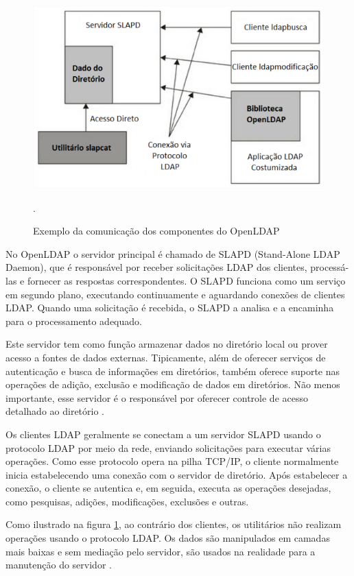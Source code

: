 \begin{figure}[h]
    \centering
	\includegraphics[scale=0.9]{projeto/textuais/ComunicacaoLDAP.png}
	\caption[Exemplo da comunicação dos componentes do OpenLDAP]{Exemplo da comunicação dos componentes do OpenLDAP \cite{lima2021estudo}}.
	\label{fig:compLDAP}
\end{figure}

No OpenLDAP o servidor principal é chamado de SLAPD (Stand-Alone LDAP Daemon), que é responsável por receber solicitações LDAP dos clientes, processá-las e fornecer as respostas correspondentes. O SLAPD funciona como um serviço em segundo plano, executando continuamente e aguardando conexões de clientes LDAP. Quando uma solicitação é recebida, o SLAPD a analisa e a encaminha para o processamento adequado. 

Este servidor tem como função armazenar dados no diretório local ou prover acesso a fontes de dados externas. Tipicamente, além de oferecer serviços de autenticação e busca de informações em diretórios, também oferece suporte nas operações de adição, exclusão e modificação de dados em diretórios. Não menos importante, esse servidor é o responsável por oferecer controle de acesso detalhado ao diretório \cite{universidade-fumec}.

Os clientes LDAP geralmente se conectam a um servidor SLAPD usando o protocolo LDAP por meio da rede, enviando solicitações para executar várias operações. Como esse protocolo opera na pilha TCP/IP, o cliente normalmente inicia estabelecendo uma conexão com o servidor de diretório. Após estabelecer a conexão, o cliente se autentica e, em seguida, executa as operações desejadas, como pesquisas, adições, modificações, exclusões e outras.

Como ilustrado na figura \ref{fig:compLDAP}, ao contrário dos clientes, os utilitários não realizam operações usando o protocolo LDAP. Os dados são manipulados em camadas mais baixas e sem mediação pelo servidor, são usados na realidade para a manutenção do servidor \cite{lima2021estudo}.

